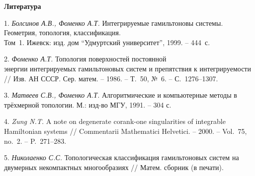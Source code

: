\smallskip \centerline {\bf Литература} \nopagebreak

1. {\it Болсинов А.В., Фоменко А.Т.} Интегрируемые гамильтоновы системы. Геометрия, топология, классификация. \\ Том~1. Ижевск: изд. дом ``Удмуртский университет'', 1999. -- 444~с.

2. {\it Фоменко А.Т.} Топология поверхностей постоянной\\ энергии интегрируемых гамильтоновых систем и препятствия к интегрируемости // Изв. АН СССР. Сер. матем. -- 1986. -- Т.~50, №~6. -- С.~1276--1307.

3. {\it Матвеев С.В., Фоменко А.Т.} Алгоритмические и компьютерные методы в трёхмерной топологии. М.: изд-во МГУ, 1991. -- 304 с.

4. {\it Zung N.T.} A note on degenerate corank-one singularities of integrable Hamiltonian systems // Commentarii Mathematici Helvetici. -- 2000. -- Vol.~75, no.~2. -- P.~271--283.

5. {\it Николаенко С.С.} Топологическая классификация гамильтоновых систем на двумерных некомпактных многообразиях // Матем. сборник (в печати).
